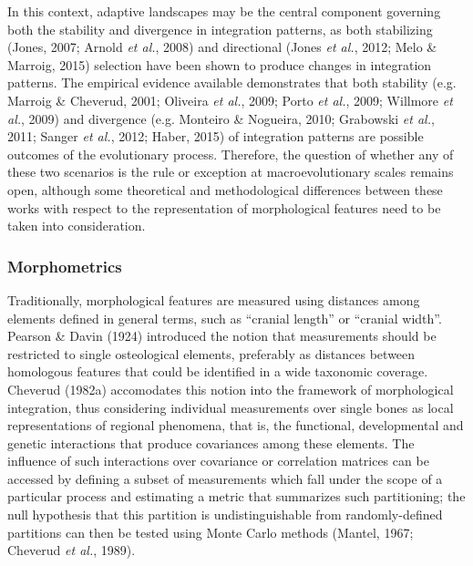 \documentclass[12pt,twoside]{report}
\begin{document}
In this context, adaptive landscapes may be the central component
governing both the stability and divergence in integration patterns, as
both stabilizing (Jones, 2007; Arnold \emph{et al.}, 2008) and
directional (Jones \emph{et al.}, 2012; Melo \& Marroig, 2015) selection
have been shown to produce changes in integration patterns. The
empirical evidence available demonstrates that both stability (e.g.
Marroig \& Cheverud, 2001; Oliveira \emph{et al.}, 2009; Porto \emph{et
al.}, 2009; Willmore \emph{et al.}, 2009) and divergence (e.g. Monteiro
\& Nogueira, 2010; Grabowski \emph{et al.}, 2011; Sanger \emph{et al.},
2012; Haber, 2015) of integration patterns are possible outcomes of the
evolutionary process. Therefore, the question of whether any of these
two scenarios is the rule or exception at macroevolutionary scales
remains open, although some theoretical and methodological differences
between these works with respect to the representation of morphological
features need to be taken into consideration.

\subsubsection{Morphometrics}\label{morphometrics}

Traditionally, morphological features are measured using distances among
elements defined in general terms, such as ``cranial length'' or
``cranial width''. Pearson \& Davin (1924) introduced the notion that
measurements should be restricted to single osteological elements,
preferably as distances between homologous features that could be
identified in a wide taxonomic coverage. Cheverud (1982a) accomodates
this notion into the framework of morphological integration, thus
considering individual measurements over single bones as local
representations of regional phenomena, that is, the functional,
developmental and genetic interactions that produce covariances among
these elements. The influence of such interactions over covariance or
correlation matrices can be accessed by defining a subset of
measurements which fall under the scope of a particular process and
estimating a metric that summarizes such partitioning; the null
hypothesis that this partition is undistinguishable from
randomly-defined partitions can then be tested using Monte Carlo methods
(Mantel, 1967; Cheverud \emph{et al.}, 1989).
\end{document}
